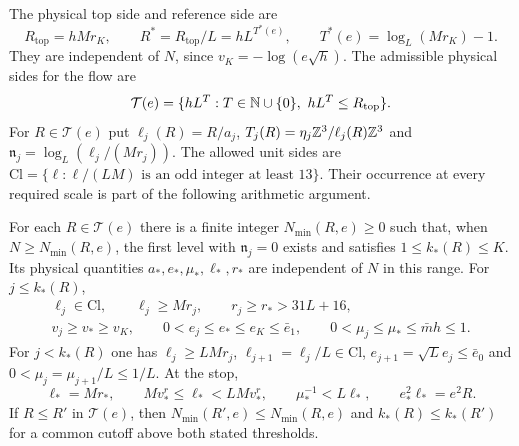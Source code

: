 The physical top side and reference side are
\begin{equation}\label{eq:rgfl-reference-sides}
 R_{\mathrm{top}}=hMr_K,\qquad
 R^*=R_{\mathrm{top}}/L=hL^{T^*(e)},\qquad
 T^*(e)=\log_L(Mr_K)-1.
\end{equation}
They are independent of $N$, since
$v_K=-\log(e\sqrt h)$.
The admissible physical sides for the flow are
\[
 \mathcal T(e)=\{hL^T:T\in\mathbb N\cup\{0\},\ hL^T\le R_{\mathrm{top}}\}.
\]
For $R\in\mathcal T(e)$ put
$\ell_j(R)=R/a_j$,
$T_j(R)=\eta_j\mathbb Z^3/\ell_j(R)\mathbb Z^3$ and
$\mathfrak n_j=\log_L(\ell_j/(Mr_j))$.
The allowed unit sides are
$\mathrm{Cl}=\{\ell:\ell/(LM)\text{ is an odd integer at least }13\}$.
Their occurrence at every required scale is part
of the following arithmetic argument.

\begin{proposition}\label{prop:rgfl-scales}
For each $R\in\mathcal T(e)$ there is a finite integer
$N_{\min}(R,e)\ge0$ such that, when $N\ge N_{\min}(R,e)$,
the first level with $\mathfrak n_j=0$ exists and
satisfies $1\le k_*(R)\le K$.
Its physical quantities $a_*,e_*,\mu_*,\ell_*,r_*$
are independent of $N$ in this range.
For $j\le k_*(R)$,
\begin{equation}\label{eq:rgfl-scale-ranges}
 \begin{gathered}
 \ell_j\in\mathrm{Cl},\qquad
 \ell_j\ge Mr_j,\qquad r_j\ge r_*>31L+16,\\
 v_j\ge v_*\ge v_K,\qquad
 0<e_j\le e_*\le e_K\le\bar e_1,\qquad
 0<\mu_j\le\mu_*\le\bar m h\le1 .
 \end{gathered}
\end{equation}
For $j<k_*(R)$ one has $\ell_j\ge LMr_j$,
$\ell_{j+1}=\ell_j/L\in\mathrm{Cl}$,
$e_{j+1}=\sqrt L e_j\le\bar e_0$ and
$0<\mu_j=\mu_{j+1}/L\le1/L$.
At the stop,
\begin{equation}\label{eq:rgfl-terminal-scales}
 \ell_*=Mr_*,\qquad
 Mv_*^r\le\ell_*<LMv_*^r,\qquad
 \mu_*^{-1}<L\ell_*,\qquad e_*^2\ell_*=e^2R.
\end{equation}
If $R\le R'$ in $\mathcal T(e)$, then
$N_{\min}(R',e)\le N_{\min}(R,e)$ and
$k_*(R)\le k_*(R')$ for a common cutoff above both stated thresholds.
\end{proposition}

